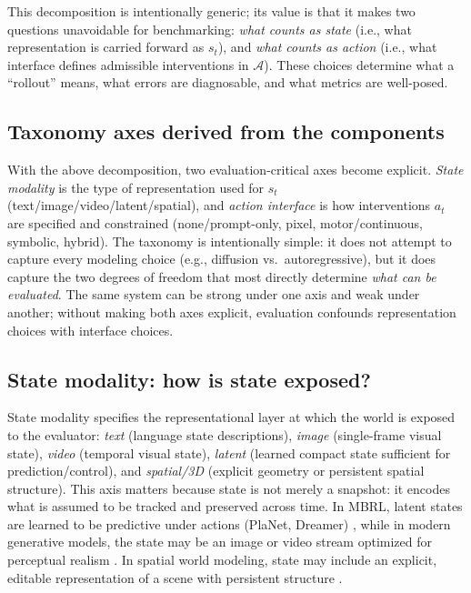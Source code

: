 \documentclass{article}
\theoremstyle{plain}
\theoremstyle{definition}
\theoremstyle{remark}
\begin{document}
This decomposition is intentionally generic; its value is that it makes two questions unavoidable for benchmarking: \emph{what counts as state} (i.e., what representation is carried forward as $s_t$), and \emph{what counts as action} (i.e., what interface defines admissible interventions in $\mathcal{A}$). These choices determine what a ``rollout'' means, what errors are diagnosable, and what metrics are well-posed.

\subsection{Taxonomy axes derived from the components}
With the above decomposition, two evaluation-critical axes become explicit.
\emph{State modality} is the type of representation used for $s_t$ (text/image/video/latent/spatial), and \emph{action interface} is how interventions $a_t$ are specified and constrained (none/prompt-only, pixel, motor/continuous, symbolic, hybrid). The taxonomy is intentionally simple: it does not attempt to capture every modeling choice (e.g., diffusion vs.\ autoregressive), but it does capture the two degrees of freedom that most directly determine \emph{what can be evaluated}. The same system can be strong under one axis and weak under another; without making both axes explicit, evaluation confounds representation choices with interface choices.

\subsection{State modality: how is state exposed?}
State modality specifies the representational layer at which the world is exposed to the evaluator:
\emph{text} (language state descriptions), \emph{image} (single-frame visual state), \emph{video} (temporal visual state), \emph{latent} (learned compact state sufficient for prediction/control), and \emph{spatial/3D} (explicit geometry or persistent spatial structure). This axis matters because state is not merely a snapshot: it encodes what is assumed to be tracked and preserved across time. In MBRL, latent states are learned to be predictive under actions (PlaNet, Dreamer) \cite{hafner2019planet,hafner2020dreamer,hafner2021dreamerv2}, while in modern generative models, the state may be an image or video stream optimized for perceptual realism \cite{sora2024,veo2024,wu2023vastdreamer,lu2024freelong,tan2024videoinfinity}. In spatial world modeling, state may include an explicit, editable representation of a scene with persistent structure \cite{worldlabs2024}.
\end{document}
